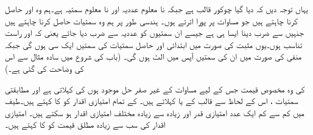 یہاں توجہ دیں کہ  دیا گیا چوکور قالب ہے جبکہ  نا معلوم عددیہ اور  نا معلوم سمتیہ ہے۔ہم وہ  اور  حاصل کرنا چاہتے ہیں جو مساوات  پر پورا اترتے ہوں۔ ہندسی طور پر ہم وہ سمتیات  حاصل کرنا چاہتے ہیں جنہیں  سے ضرب دینا ایسا ہی ہے جیسے ان سمتیوں کو عددیہ  سے ضرب دیا جائے یعنی کہ  اور  راست تناسب ہوں۔یوں مثبت  کی صورت میں ابتدائی اور حاصل سمتیات کی سمتیں ایک سی  ہوں گی جبکہ منفی  کی صورت میں ان کی سمتیں آپس میں الٹ ہوں گی۔ (باب کی شروع میں سادہ مثال سے اس کی وضاحت کی گئی ہے۔)

  کی وہ مخصوص قیمت جس کے لیے مساوات  کے غیر صفر  حل موجود ہوں   کی  کہلاتی ہے اور مطابقتی سمتیات ،  اس  کے لحاظ سے قالب  کے   یا  کہلاتے ہیں۔ کے تمام امتیازی اقدار کو  کا  کہتے ہیں۔طیف میں کم سے کم ایک عدد امتیازی قدر اور زیادہ سے زیادہ  مختلف امتیازی اقدار ہو سکتے ہیں۔ امتیازی اقدار کی سب سے  زیادہ مطلق قیمت کو  کا  کہتے ہیں۔

